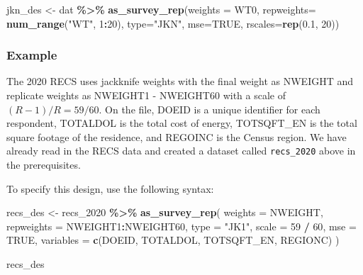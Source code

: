 \documentclass[
]{krantz}
\makeatletter
\newenvironment{Shaded}{\begin{snugshade}}{\end{snugshade}}
\newcommand{\AttributeTok}[1]{\textcolor[rgb]{0.27,0.27,0.27}{#1}}
\newcommand{\ConstantTok}[1]{\textcolor[rgb]{0.37,0.37,0.37}{#1}}
\newcommand{\DecValTok}[1]{\textcolor[rgb]{0.06,0.06,0.06}{#1}}
\newcommand{\FloatTok}[1]{\textcolor[rgb]{0.06,0.06,0.06}{#1}}
\newcommand{\FunctionTok}[1]{\textcolor[rgb]{0.27,0.27,0.27}{\textbf{#1}}}
\newcommand{\NormalTok}[1]{#1}
\newcommand{\OtherTok}[1]{\textcolor[rgb]{0.37,0.37,0.37}{#1}}
\newcommand{\SpecialCharTok}[1]{\textcolor[rgb]{0.43,0.43,0.43}{\textbf{#1}}}
\newcommand{\StringTok}[1]{\textcolor[rgb]{0.5,0.5,0.5}{#1}}
\newenvironment{kframe}{%
\medskip{}
\setlength{\fboxsep}{.8em}
 \def\at@end@of@kframe{}%
 \ifinner\ifhmode%
  \def\at@end@of@kframe{\end{minipage}}%
  \begin{minipage}{\columnwidth}%
 \fi\fi%
 \def\FrameCommand##1{\hskip\@totalleftmargin \hskip-\fboxsep
 \colorbox{shadecolor}{##1}\hskip-\fboxsep
     \hskip-\linewidth \hskip-\@totalleftmargin \hskip\columnwidth}%
 \MakeFramed {\advance\hsize-\width
   \@totalleftmargin\z@ \linewidth\hsize
   \@setminipage}}%
 {\par\unskip\endMakeFramed%
 \at@end@of@kframe}
\renewenvironment{Shaded}{\begin{kframe}}{\end{kframe}}
\makeatother
\begin{document}
\begin{Shaded}
\begin{Highlighting}[]
\NormalTok{jkn\_des }\OtherTok{\textless{}{-}}\NormalTok{ dat }\SpecialCharTok{\%\textgreater{}\%}
 \FunctionTok{as\_survey\_rep}\NormalTok{(}\AttributeTok{weights =}\NormalTok{ WT0, }
               \AttributeTok{repweights=} \FunctionTok{num\_range}\NormalTok{(}\StringTok{"WT"}\NormalTok{, }\DecValTok{1}\SpecialCharTok{:}\DecValTok{20}\NormalTok{),}
               \AttributeTok{type=}\StringTok{"JKN"}\NormalTok{, }
               \AttributeTok{mse=}\ConstantTok{TRUE}\NormalTok{, }
               \AttributeTok{rscales=}\FunctionTok{rep}\NormalTok{(}\FloatTok{0.1}\NormalTok{, }\DecValTok{20}\NormalTok{))}
\end{Highlighting}
\end{Shaded}

\hypertarget{example-9}{%
\subsubsection*{Example}\label{example-9}}


The 2020 RECS \citep{recs-2020-micro} uses jackknife weights with the final weight as NWEIGHT and replicate weights as NWEIGHT1 - NWEIGHT60 with a scale of \((R-1)/R=59/60\). On the file, DOEID is a unique identifier for each respondent, TOTALDOL is the total cost of energy, TOTSQFT\_EN is the total square footage of the residence, and REGOINC is the Census region. We have already read in the RECS data and created a dataset called \texttt{recs\_2020} above in the prerequisites.

To specify this design, use the following syntax:

\begin{Shaded}
\begin{Highlighting}[]
\NormalTok{recs\_des }\OtherTok{\textless{}{-}}\NormalTok{ recs\_2020 }\SpecialCharTok{\%\textgreater{}\%}
  \FunctionTok{as\_survey\_rep}\NormalTok{(}
    \AttributeTok{weights =}\NormalTok{ NWEIGHT,}
    \AttributeTok{repweights =}\NormalTok{ NWEIGHT1}\SpecialCharTok{:}\NormalTok{NWEIGHT60,}
    \AttributeTok{type =} \StringTok{"JK1"}\NormalTok{,}
    \AttributeTok{scale =} \DecValTok{59} \SpecialCharTok{/} \DecValTok{60}\NormalTok{,}
    \AttributeTok{mse =} \ConstantTok{TRUE}\NormalTok{,}
    \AttributeTok{variables =} \FunctionTok{c}\NormalTok{(DOEID, TOTALDOL, TOTSQFT\_EN, REGIONC)}
\NormalTok{  )}

\NormalTok{recs\_des}
\end{Highlighting}
\end{Shaded}
\end{document}
